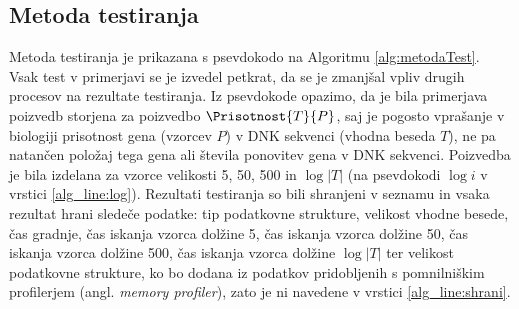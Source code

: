 \subsection{Metoda testiranja}
Metoda testiranja je prikazana s psevdokodo na Algoritmu \ref{alg:metodaTest}. Vsak test v primerjavi se je izvedel petkrat, da se je zmanjšal vpliv drugih procesov na rezultate testiranja. Iz psevdokode opazimo, da je bila primerjava poizvedb storjena za poizvedbo $\Prisotnost{T}{P}$, saj je pogosto vprašanje v biologiji prisotnost gena (vzorcev $P$) v DNK sekvenci (vhodna beseda $T$), ne pa natančen položaj tega gena ali števila ponovitev gena v DNK sekvenci. Poizvedba je bila izdelana za vzorce velikosti 5, 50, 500 in $\log{|T|}$ (na psevdokodi $\log{i}$ v vrstici \ref{alg_line:log}). Rezultati testiranja so bili shranjeni v seznamu in vsaka rezultat hrani sledeče podatke: tip podatkovne strukture, velikost vhodne besede, čas gradnje, čas iskanja vzorca dolžine 5, čas iskanja vzorca dolžine 50, čas iskanja vzorca dolžine 500, čas iskanja vzorca dolžine $\log{|T|}$ ter velikost podatkovne strukture, ko bo dodana iz podatkov pridobljenih s pomnilniškim profilerjem (angl. \textit{memory profiler}), zato je ni navedene v vrstici \ref{alg_line:shrani}. 

